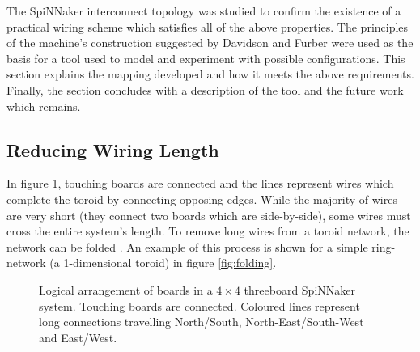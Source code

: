 		The SpiNNaker interconnect topology was studied to confirm the existence of
		a practical wiring scheme which satisfies all of the above properties. The
		principles of the machine's construction suggested by Davidson
		\cite{davidsonWiring} and Furber \cite{furber13email} were used as the basis
		for a tool used to model and experiment with possible configurations. This
		section explains the mapping developed and how it meets the above
		requirements. Finally, the section concludes with a description of the tool
		and the future work which remains.
		
		\subsection{Reducing Wiring Length}
			
			\label{sec:folding-toroids}
			
			In figure \ref{fig:boardsLogical}, touching boards are connected and the
			lines represent wires which complete the toroid by connecting opposing
			edges. While the majority of wires are very short (they connect two boards
			which are side-by-side), some wires must cross the entire system's length.
			To remove long wires from a toroid network, the network can be folded
			\cite{dally04}. An example of this process is shown for a simple
			ring-network (a 1-dimensional toroid) in figure \ref{fig:folding}.
			
			\begin{figure}
				\center
				
				\caption[Logical arrangement of boards in a $4\times4$ threeboard
				SpiNNaker system.]{Logical arrangement of boards in a $4\times4$
				threeboard SpiNNaker system. Touching boards are connected. Coloured
				lines represent long connections travelling {\color{red}North/South},
				{\color{green}North-East/South-West} and {\color{blue}East/West}.}
				\label{fig:boardsLogical}
			\end{figure}
			
